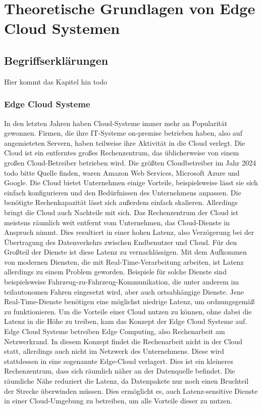 \newpage
\section{Theoretische Grundlagen von Edge Cloud Systemen} \label{infos}









\subsection{Begriffserklärungen}

Hier kommt das Kapitel hin todo
\\
\cite[Quelle: Vgl.][]{FOM}


\subsubsection{Edge Cloud Systeme}

In den letzten Jahren haben Cloud-Systeme immer mehr an Popularität gewonnen. Firmen, die ihre IT-Systeme on-premise betrieben haben, also auf angemieteten Servern, haben teilweise ihre Aktivität in die Cloud verlegt. 
Die Cloud ist ein entferntes großes Rechenzentrum, das üblicherweise von einem großen Cloud-Betreiber betrieben wird. Die größten Cloudbetreiber im Jahr 2024 todo bitte Quelle finden, waren Amazon Web Services, 
Microsoft Azure und Google. Die Cloud bietet Unternehmen einige Vorteile, beispielsweise lässt sie sich einfach konfigurieren und den Bedürfnissen des Unternehmens anpassen. 
Die benötigte Rechenkapazität lässt sich außerdem einfach skalieren. Allerdings bringt die Cloud auch Nachteile mit sich. Das Rechenzentrum der Cloud ist meistens räumlich weit entfernt vom Unternehmen, das Cloud-Dienste in Anspruch nimmt. 
Dies resultiert in einer hohen Latenz, also Verzögerung bei der Übertragung des Datenverkehrs zwischen Endbenutzer und Cloud. Für den Großteil der Dienste ist diese Latenz zu vernachlässigen. 
Mit dem Aufkommen von modernen Diensten, die mit Real-Time-Verarbeitung arbeiten, ist Latenz allerdings zu einem Problem geworden. Beispiele für solche Dienste sind beispielsweise Fahrzeug-zu-Fahrzeug-Kommunikation, 
die unter anderem im teilautonomen Fahren eingesetzt wird, aber auch ortsabhängige Dienste. Jene Real-Time-Dienste benötigen eine möglichst niedrige Latenz, um ordnungsgemäß zu funktionieren. 
Um die Vorteile einer Cloud nutzen zu können, ohne dabei die Latenz in die Höhe zu treiben, kam das Konzept der Edge Cloud Systeme auf. Edge Cloud Systeme betreiben Edge Computing, also Rechenarbeit am Netzwerkrand. 
In diesem Konzept findet die Rechenarbeit nicht in der Cloud statt, allerdings auch nicht im Netzwerk des Unternehmens. Diese wird stattdessen in eine sogenannte Edge-Cloud verlagert. 
Dies ist ein kleineres Rechenzentrum, dass sich räumlich näher an der Datenquelle befindet. Die räumliche Nähe reduziert die Latenz, da Datenpakete nur noch einen Bruchteil der Strecke überwinden müssen. 
Dies ermöglicht es, auch Latenz-sensitive Dienste in einer Cloud-Umgebung zu betreiben, um alle Vorteile dieser zu nutzen.


